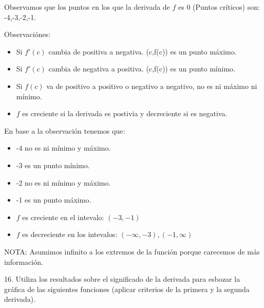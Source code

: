 \documentclass[12pt]{article}
\begin{document}
\begin{enumerate}[\hspace{9px} a)]
        Observamos que los puntos en los que la derivada de $f$ es 0 (Puntos cr\'iticos) son: -4,-3,-2,-1.

        Observaci\'ones: 
        \begin{itemize}
            \item Si $f'(c)$ cambia de positiva a negativa. (c,f(c)) es un punto m\'aximo.
            \item Si $f'(c)$ cambia de negativa a positiva. (c,f(c)) es un punto m\'inimo.
            \item Si $f(c)$ va de positivo a positivo o negativo a negativo, no es ni m\'aximo ni m\'inimo.
            \item $f$ es creciente si la derivada es postivia y decreciente si es negativa.
        \end{itemize}\medskip

        En base a la observaci\'on tenemos que:
        \begin{itemize}
            \item -4 no es ni m\'inimo y m\'aximo.
            \item -3 es un punto m\'inimo.
            \item -2 no es ni m\'inimo y m\'aximo.
            \item -1 es un punto m\'aximo.\bigskip
            \item $f$ es creciente en el intevalo: \((-3,-1)\)
            \item $f$ es decreciente en los intevalos: \((-\infty,-3),(-1,\infty)\)
        \end{itemize}\medskip

        NOTA: Asumimos infinito a los extremos de la funci\'on porque carecemos de m\'as informaci\'on.\medskip 

\end{enumerate}

16. Utiliza los resultados sobre el significado de la derivada para esbozar la gr\'afica de las siguientes funciones (aplicar criterios de la primera y la segunda derivada).
\end{document}
